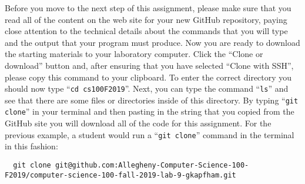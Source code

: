 \documentclass[11pt]{article}
\newcommand{\command}[1]{``\lstinline{#1}''}
\newcommand{\channel}[1]{\lstinline{#1}}
\begin{document}


Before you move to the next step of this assignment, please make sure that you
read all of the content on the web site for your new GitHub repository, paying
close attention to the technical details about the commands that you will type
and the output that your program must produce. Now you are ready to download the
starting materials to your laboratory computer. Click the ``Clone or download''
button and, after ensuring that you have selected ``Clone with SSH'', please
copy this command to your clipboard. To enter the correct directory you should
now type \command{cd cs100F2019}. Next, you can type the command \command{ls}
and see that there are some files or directories inside of this directory. By
typing \command{git clone} in your terminal and then pasting in the string that
you copied from the GitHub site you will download all of the code for this
assignment. For the previous example, a student would run a \command{git clone}
command in the terminal in this fashion:

\begin{lstlisting}
  git clone git@github.com:Allegheny-Computer-Science-100-F2019/computer-science-100-fall-2019-lab-9-gkapfham.git
\end{lstlisting}
\end{document}
